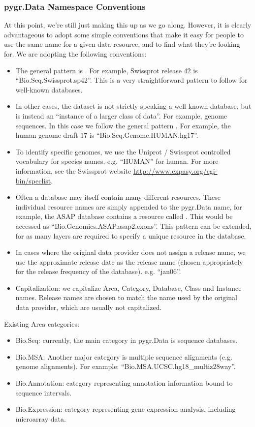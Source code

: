 \documentclass{howto}
\begin{document}
\subsubsection{pygr.Data Namespace Conventions}
At this point, we're still just making this up as we go along.
However, it is clearly advantageous to adopt some simple conventions
that make it easy for people to use the same name for a given data resource,
and to find what they're looking for.  We are adopting the following conventions:
\begin{itemize}
\item The general pattern is .  For example,
Swissprot release 42 is ``Bio.Seq.Swissprot.sp42''.  This is a very straightforward
pattern to follow for well-known databases.
\item In other cases, the dataset is not strictly speaking a well-known database,
but is instead an ``instance of a larger class of data''.  For example, genome
sequences.  In this case we follow the general pattern 
.  For example, the human genome draft
17 is ``Bio.Seq.Genome.HUMAN.hg17''.  
\item To identify specific genomes, we use the Uniprot / Swissprot 
controlled vocabulary for species names, e.g. ``HUMAN'' for human.  For more
information, see the Swissprot website
\url{http://www.expasy.org/cgi-bin/speclist}.
\item  Often a database may itself contain many different resources.  These
individual resource names are simply appended to the pygr.Data name, for example,
the ASAP database contains a resource called .  This would be 
accessed as ``Bio.Genomics.ASAP.asap2.exons''.  This pattern can be extended,
for as many layers are required to specify a unique resource in the database.
\item In cases where the original data provider does not assign a release name, 
we use the approximate release date as the release name (chosen appropriately
for the release frequency of the database).  e.g. ``jan06''.
\item Capitalization: we capitalize Area, Category, Database, Class and Instance
names.  Release names are chosen to match the name used by the original data 
provider, which are usually not capitalized.
\end{itemize}
Existing Area categories:
\begin{itemize}
\item Bio.Seq: currently, the main category in pygr.Data is sequence databases.
\item Bio.MSA: Another major category is multiple sequence alignments (e.g. genome alignments).
For example: ``Bio.MSA.UCSC.hg18_multiz28way''.
\item Bio.Annotation: category representing annotation information bound
to sequence intervals.
\item Bio.Expression: category representing gene expression analysis,
including microarray data.
\end{itemize}
\end{document}
